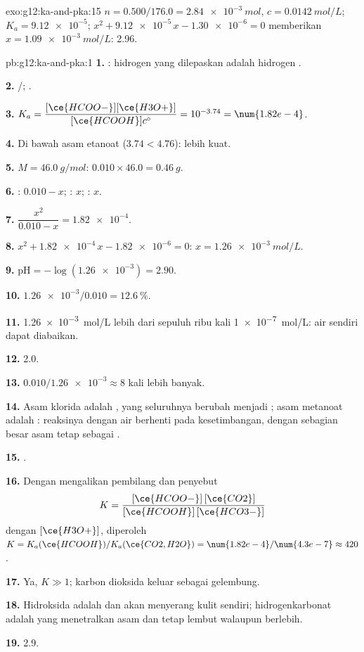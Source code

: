 \begin{solution}{exo:g12:ka-and-pka:15}
$n = 0.500 / 176.0 = \qty{2.84e-3}{mol}$, $c = \qty{0.0142}{mol/L}$;
$K_a = \num{9.12e-5}$; $x^2 + \num{9.12e-5}\,x - \num{1.30e-6} = 0$
memberikan $x = \qty{1.09e-3}{mol/L}$:  2.96.
\end{solution}

\begin{solution}{pb:g12:ka-and-pka:1}
\textbf{1.} : hidrogen yang dilepaskan adalah hidrogen
.

\textbf{2.} /; .

\textbf{3.} $K_a = \dfrac{[\ce{HCOO-}][\ce{H3O+}]}{[\ce{HCOOH}]c^\circ} =
10^{-3.74} = \num{1.82e-4}$.

\textbf{4.} Di bawah asam etanoat ($3.74 < 4.76$): lebih kuat.

\textbf{5.} $M = \qty{46.0}{g/mol}$: $0.010 \times 46.0 = \qty{0.46}{g}$.

\textbf{6.} : $0.010 - x$; : $x$; : $x$.

\textbf{7.} $\dfrac{x^2}{0.010 - x} = \num{1.82e-4}$.

\textbf{8.} $x^2 + \num{1.82e-4}\,x - \num{1.82e-6} = 0$:
$x = \qty{1.26e-3}{mol/L}$.

\textbf{9.} $\mathrm{pH} = -\log(\num{1.26e-3}) = 2.90$.

\textbf{10.} $\num{1.26e-3}/0.010 = \qty{12.6}{\percent}$.

\textbf{11.} \qty{1.26e-3}{mol/L} lebih dari sepuluh ribu kali
\qty{1e-7}{mol/L}:  air sendiri dapat diabaikan.

\textbf{12.}  2.0.

\textbf{13.} $0.010 / \num{1.26e-3} \approx 8$ kali lebih banyak.

\textbf{14.} Asam klorida adalah , yang seluruhnya berubah
menjadi ; asam metanoat adalah : reaksinya dengan air
berhenti pada kesetimbangan, dengan sebagian besar asam tetap sebagai
.

\textbf{15.} .

\textbf{16.} Dengan mengalikan pembilang dan penyebut
\[
  K = \frac{[\ce{HCOO-}]\,[\ce{CO2}]}{[\ce{HCOOH}]\,[\ce{HCO3-}]}
\]
dengan $[\ce{H3O+}]$, diperoleh $K = K_a(\ce{HCOOH}) / K_a(\ce{CO2,H2O}) =
\num{1.82e-4}/\num{4.3e-7} \approx 420$.

\textbf{17.} Ya, $K \gg 1$; karbon dioksida keluar sebagai gelembung.

\textbf{18.} Hidroksida adalah  dan akan menyerang kulit
sendiri; hidrogenkarbonat adalah  yang menetralkan asam dan
tetap lembut walaupun berlebih.

\textbf{19.}  2.9.
\end{solution}
